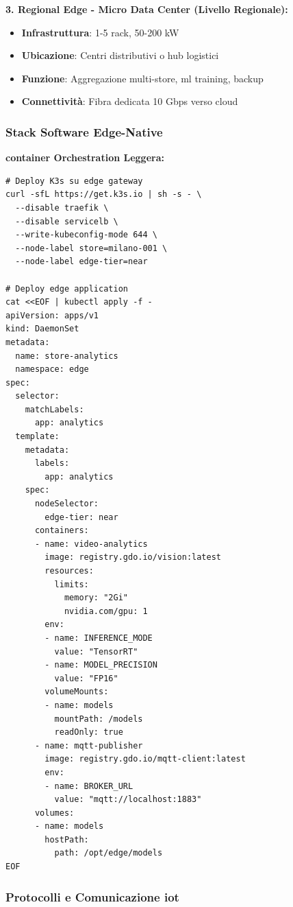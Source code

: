\textbf{3. Regional Edge - Micro Data Center (Livello Regionale):}
\begin{itemize}
    \item \textbf{Infrastruttura}: 1-5 rack, 50-200 kW
    \item \textbf{Ubicazione}: Centri distributivi o hub logistici
    \item \textbf{Funzione}: Aggregazione multi-store, \gls{ml} training, backup
    \item \textbf{Connettività}: Fibra dedicata 10 Gbps verso cloud
\end{itemize}

\subsubsection{\texorpdfstring{\textbf{Stack Software Edge-Native}}{3.3.2.2 - Stack Software Edge-Native}}

\textbf{\gls{container} Orchestration Leggera:}
\begin{lstlisting}[caption={K3s Deployment per Edge Store},label={lst:k3s_edge}]
# Deploy K3s su edge gateway
curl -sfL https://get.k3s.io | sh -s - \
  --disable traefik \
  --disable servicelb \
  --write-kubeconfig-mode 644 \
  --node-label store=milano-001 \
  --node-label edge-tier=near

# Deploy edge application
cat <<EOF | kubectl apply -f -
apiVersion: apps/v1
kind: DaemonSet
metadata:
  name: store-analytics
  namespace: edge
spec:
  selector:
    matchLabels:
      app: analytics
  template:
    metadata:
      labels:
        app: analytics
    spec:
      nodeSelector:
        edge-tier: near
      containers:
      - name: video-analytics
        image: registry.gdo.io/vision:latest
        resources:
          limits:
            memory: "2Gi"
            nvidia.com/gpu: 1
        env:
        - name: INFERENCE_MODE
          value: "TensorRT"
        - name: MODEL_PRECISION
          value: "FP16"
        volumeMounts:
        - name: models
          mountPath: /models
          readOnly: true
      - name: mqtt-publisher
        image: registry.gdo.io/mqtt-client:latest
        env:
        - name: BROKER_URL
          value: "mqtt://localhost:1883"
      volumes:
      - name: models
        hostPath:
          path: /opt/edge/models
EOF
\end{lstlisting}

\subsubsection{\texorpdfstring{\textbf{Protocolli e Comunicazione \gls{iot}}}{3.3.2.3 - Protocolli e Comunicazione \gls{iot}}}

